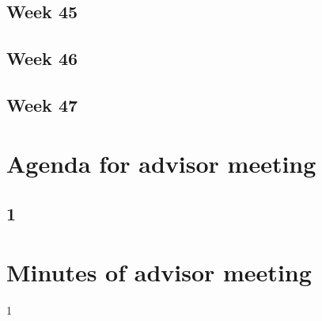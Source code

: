 \subsection{Week 45}

\subsection{Week 46}

\subsection{Week 47}

\section{Agenda for advisor meeting}

\subsection{1}


\section{Minutes of advisor meeting}

1